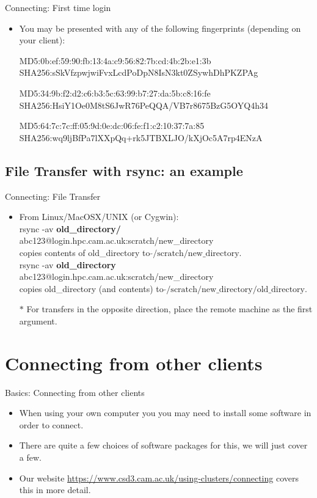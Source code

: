 \begin{frame}[fragile]{Connecting: First time login}
\begin{itemize}
\item{You may be presented with any of the following fingerprints (depending on your client):}
\begin{semiverbatim}\footnotesize

MD5:0b:ef:59:90:fb:13:4a:c9:56:82:7b:cd:4b:2b:e1:3b
SHA256:sSkVfzpwjwiFvxLcdPoDpN8IsN3kt0ZSywhDhPKZPAg

MD5:34:9b:f2:d2:c6:b3:5c:63:99:b7:27:da:5b:c8:16:fe
SHA256:HsiY1Oe0M8tS6JwR76PeQQA/VB7r8675BzG5OYQ4h34

MD5:64:7c:7c:ff:05:9d:0e:dc:06:fe:f1:c2:10:37:7a:85
SHA256:wq9ljBfPa7lXXpQq+rk5JTBXLJO/kXjOc5A7rp4ENzA

\end{semiverbatim}
\end{itemize}
\end{frame}

\subsection{File Transfer with rsync: an example}
\begin{frame}{Connecting: File Transfer}
\begin{itemize}
\item From Linux/MacOSX/UNIX (or Cygwin):\hfill\\
\alert{\footnotesize rsync -av \textbf{old\_directory/} abc123@login.hpc.cam.ac.uk:scratch/new\_directory}\hfill\\
copies contents of old\_directory to $\tilde{}\text{/scratch/new\_directory}$.\hfill\\\smallskip
\pause
\alert{\footnotesize rsync -av \textbf{old\_directory} abc123@login.hpc.cam.ac.uk:scratch/new\_directory}\hfill\\
copies old\_directory (and contents) to $\tilde{}\text{/scratch/new\_directory/old\_directory}$.\hfill\\
\pause
\item[$\ast$]For transfers in the opposite direction, place the remote machine as the first argument.
\end{itemize}
\end{frame}
%
\section{Connecting from other clients}
\begin{frame}{Basics: Connecting from other clients}
\begin{itemize}
\item{When using your own computer you you may need to install some software in order to connect.}
\pause
\item{There are quite a few choices of software packages for this, we will just cover a few.}
\pause
\item{Our website \url{https://www.csd3.cam.ac.uk/using-clusters/connecting} covers this in more detail.}
\end{itemize}
\end{frame}

